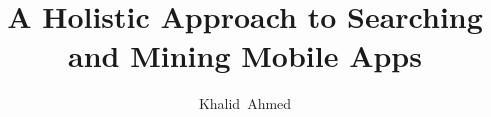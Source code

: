 \documentclass[defaultstyle,11pt]{thesis}
\title{A Holistic Approach to Searching and Mining Mobile Apps}
\author{Khalid~Ahmed}{Alharbi}
\begin{document}







%



\nocite{*}		%

%
\end{document}
